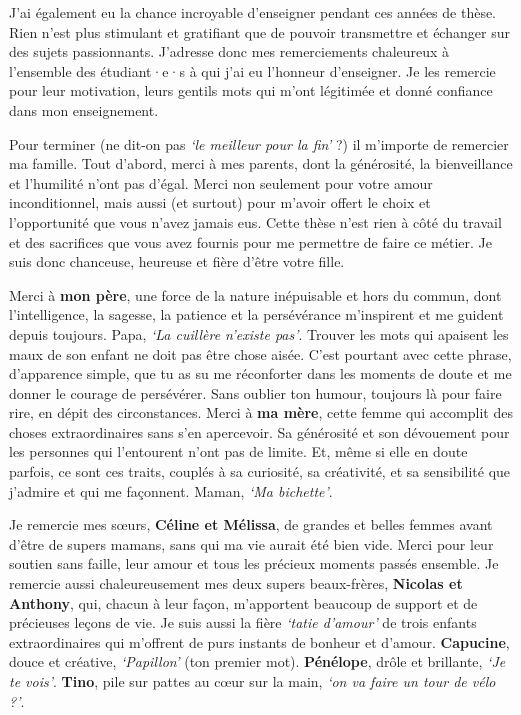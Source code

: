 \documentclass[
  a4paper,12pt,twoside,onecolumn,openright,final,oldfontcommands]{memoir}
\begin{document}
J'ai également eu la chance incroyable d'enseigner pendant ces années de thèse. Rien n'est plus stimulant et gratifiant que de pouvoir transmettre et échanger sur des sujets passionnants. J'adresse donc mes remerciements chaleureux à l'ensemble des étudiant·e·s à qui j'ai eu l'honneur d'enseigner. Je les remercie pour leur motivation, leurs gentils mots qui m'ont légitimée et donné confiance dans mon enseignement.

Pour terminer (ne dit-on pas \emph{`le meilleur pour la fin'} ?) il m'importe de remercier ma famille. Tout d'abord, merci à mes parents, dont la générosité, la bienveillance et l'humilité n'ont pas d'égal. Merci non seulement pour votre amour inconditionnel, mais aussi (et surtout) pour m'avoir offert le choix et l'opportunité que vous n'avez jamais eus. Cette thèse n'est rien à côté du travail et des sacrifices que vous avez fournis pour me permettre de faire ce métier. Je suis donc chanceuse, heureuse et fière d'être votre fille.

Merci à \textbf{mon père}, une force de la nature inépuisable et hors du commun, dont l'intelligence, la sagesse, la patience et la persévérance m'inspirent et me guident depuis toujours.
Papa, \emph{`La cuillère n'existe pas'}. Trouver les mots qui apaisent les maux de son enfant ne doit pas être chose aisée. C'est pourtant avec cette phrase, d'apparence simple, que tu as su me réconforter dans les moments de doute et me donner le courage de persévérer. Sans oublier ton humour, toujours là pour faire rire, en dépit des circonstances.
Merci à \textbf{ma mère}, cette femme qui accomplit des choses extraordinaires sans s'en apercevoir. Sa générosité et son dévouement pour les personnes qui l'entourent n'ont pas de limite. Et, même si elle en doute parfois, ce sont ces traits, couplés à sa curiosité, sa créativité, et sa sensibilité que j'admire et qui me façonnent. Maman, \emph{`Ma bichette'}.

Je remercie mes sœurs, \textbf{Céline et Mélissa}, de grandes et belles femmes avant d'être de supers mamans, sans qui ma vie aurait été bien vide. Merci pour leur soutien sans faille, leur amour et tous les précieux moments passés ensemble. Je remercie aussi chaleureusement mes deux supers beaux-frères, \textbf{Nicolas et Anthony}, qui, chacun à leur façon, m'apportent beaucoup de support et de précieuses leçons de vie. Je suis aussi la fière \emph{`tatie d'amour'} de trois enfants extraordinaires qui m'offrent de purs instants de bonheur et d'amour. \textbf{Capucine}, douce et créative, \emph{`Papillon'} (ton premier mot). \textbf{Pénélope}, drôle et brillante, \emph{`Je te vois'}. \textbf{Tino}, pile sur pattes au cœur sur la main, \emph{`on va faire un tour de vélo ?'}.
\end{document}

